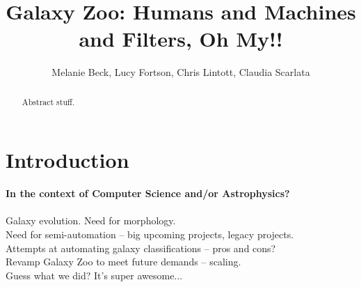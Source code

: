 \documentclass[manuscript]{emulateapj}
\begin{document}

\title{Galaxy Zoo: Humans and Machines and Filters, Oh My!!}


\author{Melanie Beck, Lucy Fortson, Chris Lintott, Claudia Scarlata}




\begin{abstract}

Abstract stuff. 
\end{abstract}



\section{Introduction}
\textbf{In the context of Computer Science and/or Astrophysics?} \\
\\
Galaxy evolution. Need for morphology. \\
Need for semi-automation -- big upcoming projects, legacy projects. \\
Attempts at automating galaxy classifications -- pros and cons? \\
Revamp Galaxy Zoo to meet future demands -- scaling. \\
Guess what we did? It's super awesome... 


\section{}

\section{}

 

\end{document}
